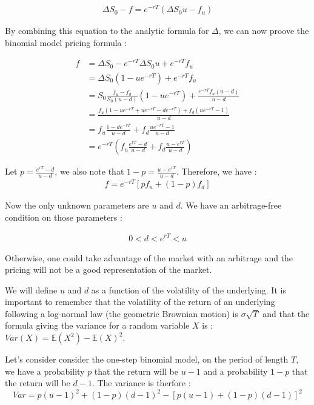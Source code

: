 \documentclass[hidelinks]{article}
\newenvironment{nalign}{
    \begin{equation}
    \begin{aligned}
}{
    \end{aligned}
    \end{equation}
    \ignorespacesafterend
}
\begin{document}
	\begin{nalign}
	\Delta S_0 - f = e^{-rT}(\Delta S_0 u - f_u)
	\end{nalign}
	
	By combining this equation to the analytic formula for $\Delta$, we can now proove the binomial model pricing formula :
	
	\begin{nalign}
	f &= \Delta S_0 - e^{-rT}\Delta S_0 u + e^{-rT}f_u \\
	&= \Delta S_0 \left( 1 - u e^{-rT} \right) + e^{-rT}f_u \\
	&= S_0 \frac{f_u - f_d}{S_0 (u-d)}\left( 1 - u e^{-rT} \right) + \frac{e^{-rT}f_u(u-d)}{u-d} \\
	&= \frac{f_u \left(1 - ue^{-rT} + ue^{-rT} - de^{-rT}\right) + f_d \left(ue^{-rT}-1\right)}{u-d} \\
	&= f_u \frac{1 - de^{-rT}}{u-d} + f_d \frac{ue^{-rT}-1}{u-d} \\
	&= e^{-rT} \left( f_u \frac{e^{rT} - d}{u-d} + f_d \frac{u-e^{rT}}{u-d}  \right)
	\end{nalign}
	
	Let $p=\frac{e^{rT} - d}{u-d} $, we also note that $1-p = \frac{u-e^{rT}}{u-d}$. Therefore, we have :
	\begin{nalign}
	f= e^{-rT} \left[ p f_u + (1-p) f_d   \right]
	\end{nalign}
	
	Now the only unknown parameters are $u$ and $d$. We have an arbitrage-free condition on those parameters :
	
	\begin{nalign}
		0<d<e^{rT}<u
	\end{nalign}
	
	Otherwise, one could take advantage of the market with an arbitrage and the pricing will not be a good representation of the market.
	
	We will define $u$ and $d$ as a function of the volatility of the underlying. It is important to remember that the volatility of the return of an underlying following a log-normal law (the geometric Brownian motion) is $\sigma \sqrt{T}$ and that the formula giving the variance for a random variable $X$ is : $Var(X)=\mathbb{E}(X^2)- \mathbb{E}(X)^2$.
	
	Let's consider consider the one-step binomial model, on the period of length $T$, we have a probability $p$ that the return will be $u-1$ and a probability $1-p$ that the return will be $d-1$. The variance is therfore :
	$$Var = p(u-1)^2+(1-p)(d-1)^2-\left[p(u-1)+(1-p)(d-1) \right]^2$$
	
\end{document}
